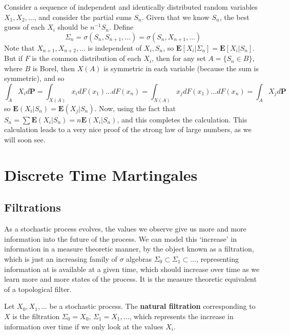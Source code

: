 \begin{example}
    Consider a sequence of independent and identically distributed random variables $X_1, X_2, \dots$, and consider the partial sums $S_n$. Given that we know $S_n$, the best guess of each $X_i$ should be $n^{-1} S_n$. Define
    \[ \Sigma_n = \sigma(S_n, S_{n+1}, \dots) = \sigma(S_n, X_{n+1}, \dots) \]
    Note that $X_{n+1}, X_{n+2}, \dots$ is independent of $X_i, S_n$, so $\mathbf{E}[X_i|\Sigma_n] = \mathbf{E}[X_i|S_n]$. But if $F$ is the common distribution of each $X_i$, then for any set $A = \{ S_n \in B \}$, where $B$ is Borel, then $X(A)$ is symmetric in each variable (because the sum is symmetric), and so
    \[ \int_A X_i d\mathbf{P} = \int_{X(A)} x_i dF(x_1) \dots dF(x_n) = \int_{X(A)} x_j dF(x_1) \dots dF(x_n) = \int_A X_j d\mathbf{P} \]
    so $\mathbf{E}(X_i|S_n) = \mathbf{E}(X_j|S_n)$. Now, using the fact that $S_n = \sum \mathbf{E}(X_i|S_n) = n\mathbf{E}(X_i|S_n)$, and this completes the calculation. This calculation leads to a very nice proof of the strong law of large numbers, as we will soon see.
\end{example}

\chapter{Discrete Time Martingales}

\section{Filtrations}

As a stochastic process evolves, the values we observe give us more and more information into the future of the process. We can model this `increase' in information in a measure theoretic manner, by the object known as a filtration, which is just an increasing family of $\sigma$ algebras $\Sigma_0 \subset \Sigma_1 \subset \dots$, representing information at is available at a given time, which should increase over time as we learn more and more states of the process. It is the measure theoretic equivalent of a topological filter.

\begin{example}
    Let $X_0, X_1, \dots$ be a stochastic process. The {\bf natural filtration} corresponding to $X$ is the filtration $\Sigma_0 = X_0$, $\Sigma_1 = X_1, \dots$, which represents the increase in information over time if we only look at the values $X_i$.
\end{example}

